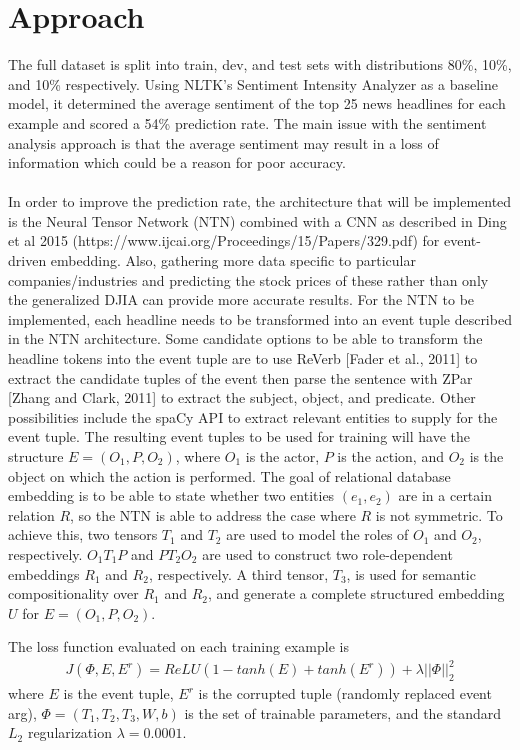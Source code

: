 \documentclass{article} %
\begin{document}
\section{Approach}

The full dataset is split into train, dev, and test sets with distributions 80\%, 10\%, and 10\% respectively.
Using NLTK's Sentiment Intensity Analyzer as a baseline model, it determined the average sentiment of the top 25 news headlines for each example and scored a 54\% prediction rate. 
The main issue with the sentiment analysis approach is that the average sentiment may result in a loss of information which could be a reason for poor accuracy.
\\ \\
In order to improve the prediction rate, the architecture that will be implemented is the Neural Tensor Network (NTN) combined with a CNN as described in Ding et al 2015 (https://www.ijcai.org/Proceedings/15/Papers/329.pdf) for event-driven embedding.
Also, gathering more data specific to particular companies/industries and predicting the stock prices of these rather than only the generalized DJIA can provide more accurate results.
For the NTN to be implemented, each headline needs to be transformed into an event tuple described in the NTN architecture.
Some candidate options to be able to transform the headline tokens into the event tuple are to use ReVerb [Fader et al., 2011]
to extract the candidate tuples of the event then parse the sentence with ZPar [Zhang and Clark, 2011] to
extract the subject, object, and predicate.
Other possibilities include the spaCy API to extract relevant entities to supply for the event tuple.
The resulting event tuples to be used for training will have the structure $E=(O_1, P, O_2)$, where $O_1$ is the actor,
$P$ is the action, and $O_2$ is the object on which the action is performed.
The goal of relational database embedding is to be able to state whether two entities $(e_1, e_2)$ are in a certain relation $R$,
so the NTN is able to address the case where $R$ is not symmetric.
To achieve this, two tensors $T_1$ and $T_2$ are used
to model the roles of $O_1$ and $O_2$, respectively. $O_1T_1P$ and
$PT_2O_2$ are used to construct two role-dependent embeddings
$R_1$ and $R_2$, respectively. A third tensor, $T_3$, is used for semantic compositionality over $R_1$ and $R_2$, and generate a complete structured embedding $U$ for $E = (O_1, P, O_2)$.

The loss function evaluated on each training example is
\begin{align}
  J(\Phi, E, E^r) = ReLU(1 - tanh(E) + tanh(E^r)) + \lambda||\Phi||^2_2
\end{align}
where $E$ is the event tuple, $E^r$ is the corrupted tuple (randomly replaced event arg), $\Phi = (T_1, T_2, T_3, W, b)$
is the set of trainable parameters, and the standard $L_2$ regularization $\lambda = 0.0001$.
\end{document}

